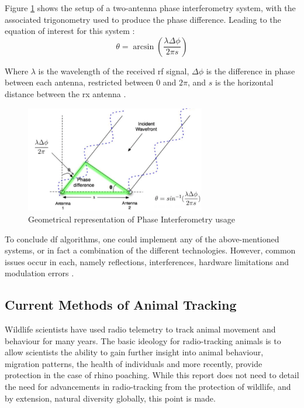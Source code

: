 \documentclass[class=report,11pt,crop=false]{standalone}
\begin{document}
Figure \ref{fig:phase_interfer} shows the setup of a two-antenna phase interferometry system, with the associated trigonometry used to produce the phase difference. Leading to the equation of interest for this system \cite{phase-diff-calc}: 
\begin{equation}
    \theta = \arcsin(\frac{\lambda \Delta \phi}{2 \pi s} ) 
    \label{eq:pd-theta}
\end{equation}

Where $\lambda$ is the wavelength of the received \gls{rf} signal, $\Delta \phi$ is the difference in phase between each antenna,  restricted between $0$ and $2\pi$, and $s$ is the horizontal distance between the \gls{rx} antenna \cite{phase-diff-calc}. 

\begin{figure}[h]
    \centering
    \captionsetup{type=figure}
    \includegraphics[width=0.7\textwidth]{Images/diagrams/phase_interferometry.png}
    \caption{Geometrical representation of Phase Interferometry usage}
    \label{fig:phase_interfer}
\end{figure}

To conclude \gls{df} algorithms, one could implement any of the above-mentioned systems, or in fact a combination of the different technologies. However, common issues occur in each, namely reflections, interferences, hardware limitations and modulation errors \cite{df-issues}. 
\subsection{Current Methods of Animal Tracking}
Wildlife scientists have used radio telemetry to track  animal movement and behaviour for many years. 
The basic ideology for radio-tracking animals is to allow scientists the ability to gain further insight into animal behaviour, migration patterns, the health of individuals and more recently, provide protection in the case of rhino poaching. While this report does not need to detail the need for advancements in radio-tracking from the protection of wildlife, and by extension, natural diversity globally, this point is made. 
\end{document}
